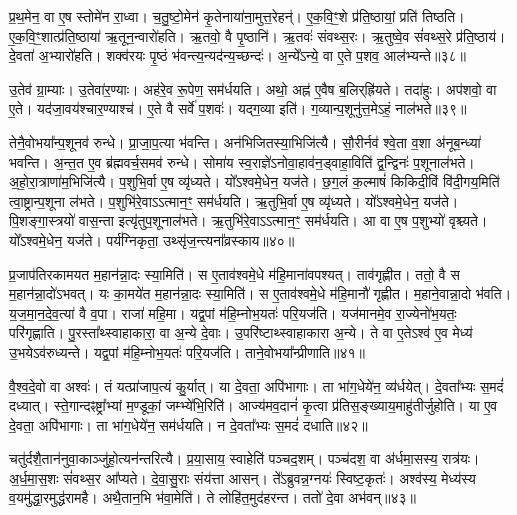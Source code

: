 प्र॒थ॒मेन॒ वा ए॒ष स्तोमे॑न रा॒ध्वा।
च॒तु॒ष्टो॒मेन॑ कृ॒तेनाया॑ना॒मुत्त॒रे\-हन्॑।
ए॒क॒वि॒ꣳ॒शे प्र॑ति॒ष्ठायां॒ प्रति॑ तिष्ठति।
ए॒क॒वि॒ꣳ॒शात्प्र॑ति॒ष्ठाया॑ ऋ॒तून॒न्वारो॑हति।
ऋ॒तवो॒ वै पृ॒ष्ठानि॑।
ऋ॒तवः॑ संवथ्स॒रः।
ऋ॒तुष्वे॒व सं॑वथ्स॒रे प्र॑ति॒ष्ठाय॑।
दे॒वता॑ अ॒भ्यारो॑हति।
शक्व॑रयः पृ॒ष्ठं भ॑वन्त्य॒न्यद॑न्य॒च्छन्दः॑।
अ॒न्ये᳚\-ऽन्ये॒ वा ए॒ते प॒शव॒ आल॑भ्यन्ते॥३८॥

उ॒तेव॑ ग्रा॒म्याः।
उ॒तेवा॑र॒ण्याः।
अह॑रे॒व रू॒पेण॒ सम॑र्धयति।
अथो॒ अह्न॑ ए॒वैष ब॒लिर्‌\mbox{}ह्रि॑यते।
तदा॑हुः।
अप॑शवो॒ वा ए॒ते।
यद॑जा॒वय॑श्चार॒ण्याश्च॑।
ए॒ते वै सर्वे॑ प॒शवः॑।
यद्ग॒व्या इति॑।
ग॒व्यान्प॒शूनु॑त्त॒मेऽहं॒ नाल॑भते॥३९॥

तेनै॒वोभया᳚न्प॒शूनव॑ रुन्धे।
प्रा॒जा॒प॒त्या भ॑वन्ति।
अन॑भि\-जितस्या॒भि\-जि॑त्यै।
सौ॒रीर्नव॑ श्वे॒ता व॒शा अ॑नूब॒न्ध्या॑ भवन्ति।
अ॒न्त॒त ए॒व ब्र॑ह्म\-वर्च॒समव॑ रुन्धे।
सोमा॑य स्व॒राज्ञे॑\-ऽनोवा॒हाव॑न॒ड्वाहा॒विति॑ द्व॒न्द्विनः॑ प॒शूनाल॑भते।
अ॒हो॒रा॒त्राणा॑म॒भिजि॑त्यै।
प॒शुभि॒र्वा ए॒ष व्यृ॑ध्यते।
यो᳚ऽश्वमे॒धेन॒ यज॑ते।
छ॒ग॒लं क॒ल्माषं॑ किकिदी॒विं वि॑दी॒गय॒मिति॑ त्वा॒ष्ट्रान्प॒शूना ल॑भते।
प॒शुभि॑रे॒वाऽऽत्मान॒ꣳ॒ सम॑र्धयति।
ऋ॒तुभि॒र्वा ए॒ष व्यृ॑ध्यते।
यो᳚ऽश्वमे॒धेन॒ यज॑ते।
पि॒शङ्गा॒स्त्रयो॑ वास॒न्ता इत्यृ॑तुप॒शूनाल॑भते।
ऋ॒तुभि॑रे॒वाऽऽत्मान॒ꣳ॒ सम॑र्धयति।
आ वा ए॒ष प॒शुभ्यो॑ वृश्च्यते।
यो᳚ऽश्वमे॒धेन॒ यज॑ते।
पर्य॑ग्निकृता॒ उथ्सृ॑ज॒न्त्यना᳚व्रस्काय॥४०॥\anuvakamend[ल॒भ्य॒न्ते॒ ल॒भ॒ते॒ त्वा॒ष्ट्रान्प॒शूनाल॑भते॒\-ऽष्टौ च॑]

प्र॒जा\-प॑तिरकामयत म॒हान॑न्ना॒दः स्या॒मिति॑।
स ए॒ताव॑श्वमे॒धे म॑हि॒माना॑वपश्यत्।
ताव॑गृह्णीत।
ततो॒ वै स म॒हान॑न्ना॒दो॑\-ऽभवत्।
यः का॒मये॑त म॒हान॑न्ना॒दः स्या॒मिति॑।
स ए॒ताव॑श्वमे॒धे म॑हि॒मानौ॑ गृह्णीत।
म॒हाने॒वान्ना॒दो भ॑वति।
य॒ज॒मा॒न॒दे॒व॒त्या॑ वै व॒पा।
राजा॑ महि॒मा।
यद्व॒पां म॑हि॒म्नोभ॒यतः॑ परि॒यज॑ति।
यज॑मानमे॒व रा॒ज्येनो॑भ॒यतः॒ परि॑गृह्णाति।
पु॒रस्ता᳚थ्स्वाहाकारा॒ वा अ॒न्ये दे॒वाः।
उ॒परि॑ष्टाथ्स्वाहाकारा अ॒न्ये।
ते वा ए॒ते\-ऽश्व॑ ए॒व मेध्य॑ उ॒भये\-ऽव॑रुध्यन्ते।
यद्व॒पां म॑हि॒म्नोभ॒यतः॑ परि॒यज॑ति।
ताने॒वोभया᳚न्प्रीणाति॥४१॥\anuvakamend[प॒रि॒यज॑ति॒ षट्च॑]

वै॒श्व॒दे॒वो वा अश्वः॑।
तं यत्प्रा॑जाप॒त्यं कु॒र्यात्।
या दे॒वता॒ अपि॑भागाः।
ता भा॑ग॒धेये॑न॒ व्य॑र्धयेत्।
दे॒वता᳚भ्यः स॒मदं॑ दध्यात्।
स्ते॒गान्दꣴष्ट्रा᳚भ्यां म॒ण्डूकां॒ जम्भ्ये॑भि॒रिति॑।
आज्य॑मव॒दानं॑ कृ॒त्वा प्र॑तिस॒ङ्ख्याय॒माहु॑तीर्जुहोति।
या ए॒व दे॒वता॒ अपि॑भागाः।
ता भा॑ग॒धेये॑न॒ सम॑र्धयति।
न दे॒वता᳚भ्यः स॒मदं॑ दधाति॥४२॥

चतु॑र्दशै॒तान॑नुवा॒काञ्जु॑हो॒त्यन॑न्तरित्यै।
प्र॒या॒साय॒ स्वाहेति॑ पञ्चद॒शम्।
पञ्च॑दश॒ वा अ॑र्धमा॒सस्य॒ रात्र॑यः।
अ॒र्ध॒मा॒स॒शः सं॑वथ्स॒र आ᳚प्यते।
दे॒वा॒सु॒राः संय॑त्ता आसन्।
ते᳚ऽब्रुवन्न॒ग्नयः॑ स्विष्ट॒कृतः॑।
अश्व॑स्य॒ मेध्य॑स्य व॒यमु॑द्धा॒रमुद्ध॑रामहै।
अथै॒तान॒भि भ॑वा॒मेति॑।
ते लोहि॑त॒मुद॑हरन्त।
ततो॑ दे॒वा अभ॑वन्॥४३॥

